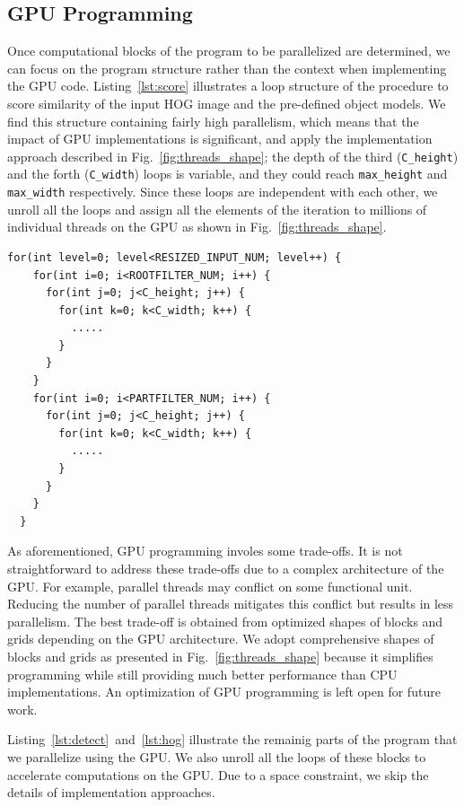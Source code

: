 \subsection{GPU Programming}

Once computational blocks of the program to be parallelized are
determined, we can focus on the program structure rather than the
context when implementing the GPU code.
Listing~\ref{lst:score} illustrates a loop structure of the procedure
to score similarity of the input HOG image and the pre-defined object
models.
We find this structure containing fairly high parallelism, which means
that the impact of GPU implementations is significant, and apply the
implementation approach described in Fig.~\ref{fig:threads_shape}; the
depth of the third (\texttt{C\_height}) and the forth
(\texttt{C\_width}) loops is variable, and they could reach
\texttt{max\_height} and \texttt{max\_width} respectively.
Since these loops are independent with each other, we unroll all the
loops and assign all the elements of the iteration to millions of
individual threads on the GPU as shown in Fig.~\ref{fig:threads_shape}.

\begin{lstlisting}[caption=The program structure of similarity scoring, label=lst:score]
  for(int level=0; level<RESIZED_INPUT_NUM; level++) {
    for(int i=0; i<ROOTFILTER_NUM; i++) {
      for(int j=0; j<C_height; j++) {
        for(int k=0; k<C_width; k++) {
          .....
        }
      }
    }
    for(int i=0; i<PARTFILTER_NUM; i++) {
      for(int j=0; j<C_height; j++) {
        for(int k=0; k<C_width; k++) {
          .....
        }
      }
    }
  }
\end{lstlisting}

As aforementioned, GPU programming involes some trade-offs.
It is not straightforward to address these trade-offs due to a complex
architecture of the GPU.
For example, parallel threads may conflict on some functional unit.
Reducing the number of parallel threads mitigates this conflict but
results in less parallelism.
The best trade-off is obtained from optimized shapes of blocks and grids
depending on the GPU architecture.
We adopt comprehensive shapes of blocks and grids as presented in
Fig.~\ref{fig:threads_shape} because it simplifies programming while
still providing much better performance than CPU implementations.
An optimization of GPU programming is left open for future work.

Listing~\ref{lst:detect}~and~\ref{lst:hog} illustrate the remainig parts
of the program that we parallelize using the GPU.
We also unroll all the loops of these blocks to accelerate computations
on the GPU.
Due to a space constraint, we skip the details of implementation approaches.

